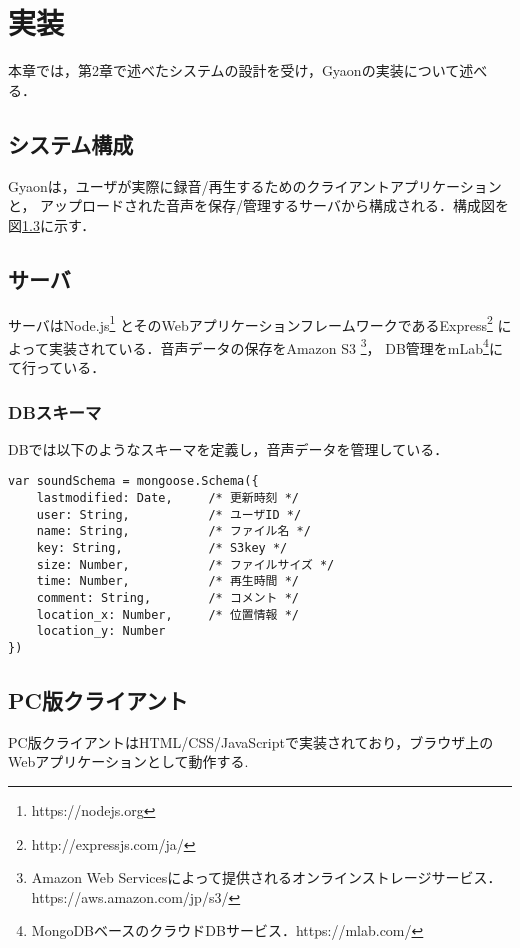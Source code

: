 \chapter{実装}
\label{chap:implementation}

本章では，第2章で述べたシステムの設計を受け，Gyaonの実装について述べる．

\newpage

\section{システム構成}
Gyaonは，ユーザが実際に録音/再生するためのクライアントアプリケーションと，
アップロードされた音声を保存/管理するサーバから構成される．構成図を図\ref{}に示す．




\section{サーバ}
サーバはNode.js\footnote{\textsf{https://nodejs.org}}
とそのWebアプリケーションフレームワークであるExpress\footnote{\textsf{http://expressjs.com/ja/}}
によって実装されている．音声データの保存をAmazon S3
\footnote{\textsf{Amazon Web Servicesによって提供されるオンラインストレージサービス．https://aws.amazon.com/jp/s3/}}，
DB管理をmLab\footnote{\textsf{MongoDBベースのクラウドDBサービス．https://mlab.com/}}にて行っている．

\subsection{DBスキーマ}

DBでは以下のようなスキーマを定義し，音声データを管理している．

\vspace{4mm}
\begin{lstlisting}
var soundSchema = mongoose.Schema({
    lastmodified: Date,     /* 更新時刻 */
    user: String,           /* ユーザID */
    name: String,           /* ファイル名 */
    key: String,            /* S3key */
    size: Number,           /* ファイルサイズ */
    time: Number,           /* 再生時間 */
    comment: String,        /* コメント */
    location_x: Number,     /* 位置情報 */
    location_y: Number
})
\end{lstlisting}

\section{PC版クライアント}
PC版クライアントはHTML/CSS/JavaScriptで実装されており，ブラウザ上のWebアプリケーションとして動作する.

